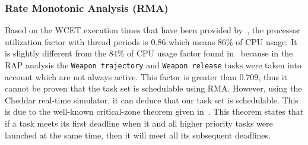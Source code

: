 \subsubsection{Rate Monotonic Analysis (RMA)}
Based on the WCET execution times that have been provided
by~\cite{locke@rtss91}, the processor utilization factor with thread
periods is $0.86$ which means $86\%$ of CPU usage. It is slightly
different from the $84\%$ of CPU usage factor found
in~\cite{locke@rtss91} because in the RAP analysis the \texttt{Weapon
  trajectory} and \texttt{Weapon release} tasks were taken into
account which are not always active. This factor is greater than
$0.709$, thus it cannot be proven that the task set is schedulable
using RMA. However, using the Cheddar real-time simulator, it can
deduce that our task set is schedulable. This is due to the well-known
critical-zone theorem given in~\cite{liu@jacm73, sha@ieeeproc94}. This
theorem states that if a task meets its first deadline when it and all
higher priority tasks were launched at the same time, then it will
meet all its subsequent deadlines.


